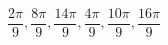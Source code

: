 \begin{displaymath}
 \frac{2\pi}{9}, \frac{8\pi}{9}, \frac{14\pi}{9}, \frac{4\pi}{9}, \frac{10\pi}{9}, \frac{16\pi}{9}
\end{displaymath}
